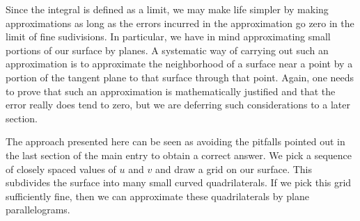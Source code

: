 \documentclass[12pt]{article}
\begin{document}
Since the integral is defined as a limit, we may make life simpler by making approximations as long as the errors incurred in the approximation go zero in the limit of fine sudivisions.  In particular, we have in mind approximating small portions of our surface by planes.  A systematic way of carrying out such an approximation is to approximate the neighborhood of a surface near a point by a portion of the tangent plane to that surface through that point.  Again, one needs to prove that such an approximation is mathematically justified and that the error really does tend to zero, but we are deferring such considerations to a later section.

The approach presented here can be seen as avoiding the pitfalls pointed out in the last section of the main entry to obtain a correct answer.  We pick a sequence of closely spaced values of $u$ and $v$ and draw a grid on our surface.  This subdivides the surface into many small curved quadrilaterals.  If we pick this grid sufficiently fine, then we can approximate these quadrilaterals by plane parallelograms.
\end{document}
